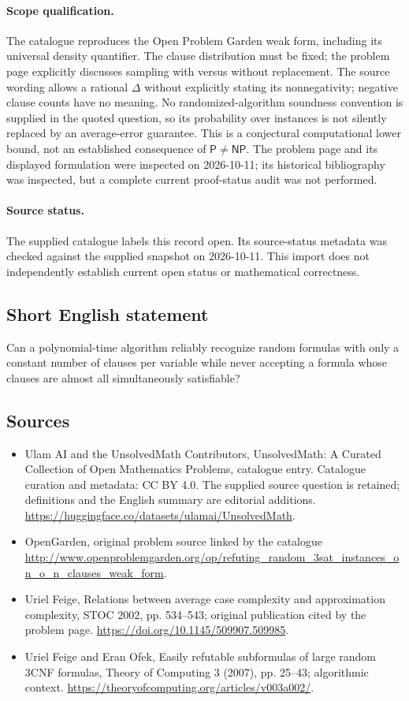 \documentclass[11pt]{article}
\begin{document}
\paragraph{Scope qualification.}
The catalogue reproduces the Open Problem Garden weak form, including its universal density quantifier. The clause distribution must be fixed; the problem page explicitly discusses sampling with versus without replacement. The source wording allows a rational $\Delta$ without explicitly stating its nonnegativity; negative clause counts have no meaning. No randomized-algorithm soundness convention is supplied in the quoted question, so its probability over instances is not silently replaced by an average-error guarantee. This is a conjectural computational lower bound, not an established consequence of $\mathsf{P}\ne\mathsf{NP}$. The problem page and its displayed formulation were inspected on 2026-10-11; its historical bibliography was inspected, but a complete current proof-status audit was not performed.
\paragraph{Source status.}
The supplied catalogue labels this record open. Its source-status metadata was checked against the supplied snapshot on 2026-10-11. This import does not independently establish current open status or mathematical correctness.
\subsection{Short English statement}
Can a polynomial-time algorithm reliably recognize random formulas with only a constant number of clauses per variable while never accepting a formula whose clauses are almost all simultaneously satisfiable?
\subsection{Sources}
\begin{itemize}
\item[\hypertarget{source:statement:1}{S1}] Ulam AI and the UnsolvedMath Contributors, UnsolvedMath: A Curated Collection of Open Mathematics Problems, catalogue entry. Catalogue curation and metadata: CC BY 4.0. The supplied source question is retained; definitions and the English summary are editorial additions.
\url{https://huggingface.co/datasets/ulamai/UnsolvedMath}.
\item[\hypertarget{source:statement:2}{S2}] OpenGarden, original problem source linked by the catalogue
\url{http://www.openproblemgarden.org/op/refuting_random_3sat_instances_on_o_n_clauses_weak_form}.
\item[\hypertarget{source:statement:3}{S3}] Uriel Feige, Relations between average case complexity and approximation complexity, STOC 2002, pp. 534--543; original publication cited by the problem page.
\url{https://doi.org/10.1145/509907.509985}.
\item[\hypertarget{source:statement:4}{S4}] Uriel Feige and Eran Ofek, Easily refutable subformulas of large random 3CNF formulas, Theory of Computing 3 (2007), pp. 25--43; algorithmic context.
\url{https://theoryofcomputing.org/articles/v003a002/}.
\end{itemize}
\end{document}
